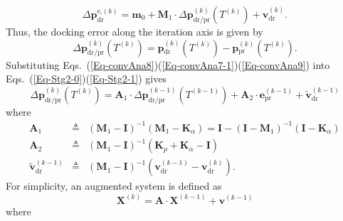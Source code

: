 \begin{equation}
\Delta{\mathbf{p}}_{\text{dr}}^{\text{e,}\left(k\right)}=\mathbf{m}_{0}+\mathbf{M}_{1}\cdot\Delta{\mathbf{p}}_{\text{dr/pr}}^{\left(k\right)}\left(T^{\left(k\right)}\right)+\mathbf{v}_{\text{dr}}^{\left(k\right)}.\label{Eq-convAna7-1}
\end{equation}
Thus, the docking error along the iteration axis is given by
\begin{equation}
\Delta{\mathbf{p}}_{\text{dr/pr}}^{\left(k\right)}\left(T^{\left(k\right)}\right)=\mathbf{p}{_{\text{dr}}^{\left(k\right)}}\left(T^{\left(k\right)}\right)-\mathbf{p}{_{\text{pr}}^{\left(k\right)}}\left(T^{\left(k\right)}\right).\label{Eq-convAna9}
\end{equation}
Substituting Eqs.~(\ref{Eq-convAna8})(\ref{Eq-convAna7-1})(\ref{Eq-convAna9})
into Eqs.~(\ref{Eq-Stg2-0})(\ref{Eq-Stg2-1}) gives
\begin{equation}
\Delta{\mathbf{p}}_{\text{dr/pr}}^{\left(k\right)}\left(T^{\left(k\right)}\right)=\mathbf{A}_{1}\cdot\Delta{\mathbf{p}}_{\text{dr/pr}}^{\left(k-1\right)}\left(T^{\left(k-1\right)}\right)+\mathbf{A}_{2}\cdot\mathbf{e}_{\text{pr}}^{(k-1)}+\mathbf{\tilde{v}}_{\text{dr}}^{\left(k-1\right)}\label{Eq-convAna10}
\end{equation}
where
\begin{eqnarray}
\mathbf{A}_{1} & \triangleq & \left(\mathbf{M}_{1}-\mathbf{I}\right)^{-1}\left(\mathbf{M}_{1}-\mathbf{K}_{\alpha}\right)=\mathbf{I-}\left(\mathbf{I-M}_{1}\right)^{-1}\left(\mathbf{I}-\mathbf{K}_{\alpha}\right)\label{Eq-convAna11-1}\\
\mathbf{A}_{2} & \triangleq & \left(\mathbf{M}_{1}-\mathbf{I}\right)^{-1}\left(\mathbf{K}_{p}+\mathbf{K}_{\alpha}-\mathbf{I}\right)\label{Eq-convAna11-2}\\
\mathbf{\tilde{v}}_{\text{dr}}^{\left(k-1\right)} & \triangleq & \left(\mathbf{M}_{1}-\mathbf{I}\right)^{-1}\left(\mathbf{v}_{\text{dr}}^{\left(k-1\right)}-\mathbf{v}_{\text{dr}}^{\left(k\right)}\right).\label{Eq-convAna11-3}
\end{eqnarray}
For simplicity, an augmented system is defined as
\begin{equation}
\mathbf{X}^{\left(k\right)}=\mathbf{A\cdot X}^{\left(k-1\right)}+\mathbf{v}^{\left(k-1\right)}\label{Eq-convAna13}
\end{equation}
where

